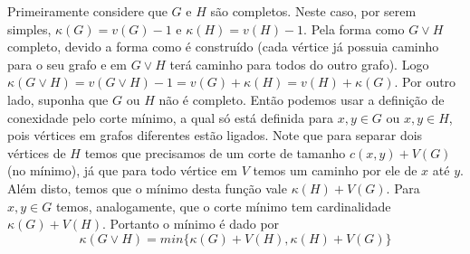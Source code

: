 
Primeiramente considere que $G$ e $H$ são completos.
Neste caso, por serem simples, $\kappa(G) = v(G) - 1$ e $\kappa(H) = v(H) - 1$.
Pela forma como $G\vee H$ completo, devido a forma como é construído (cada vértice
já possuia caminho para o seu grafo e em $G \vee H$ terá caminho para todos do 
outro grafo). Logo $\kappa(G\vee H) = v(G\vee H) - 1 = v(G) + \kappa(H) = v(H) + \kappa(G)$.
Por outro lado, suponha que $G$ ou $H$ não é completo. Então podemos usar a 
definição de conexidade pelo corte mínimo, a qual só está definida para $x,y \in G$
ou $x,y \in H$, pois vértices em grafos diferentes estão ligados. Note que para
separar dois vértices de $H$ temos que precisamos de um corte de tamanho $c(x,y) + V(G)$ (no mínimo), já que
para todo vértice em $V$ temos um caminho por ele de $x$ até $y$. Além disto, temos que
o mínimo desta função vale $\kappa(H) + V(G)$. Para $x,y \in G$ temos, analogamente,
que o corte mínimo tem cardinalidade $\kappa(G) + V(H)$. Portanto o mínimo é dado por
$$\kappa(G \vee H) = min\{\kappa(G) + V(H),\kappa(H) + V(G)\}$$
\fimprova

